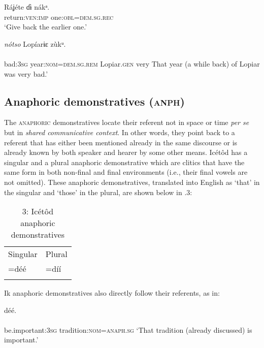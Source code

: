 \ea\label{ex:}
\gll Ráʝéte     ɗɨ nákᵃ.\\
return:\textsc{ven:imp}   one:\textsc{obl=dem.sg.rec}\\
\glt ‘Give back the earlier one.’ 
\z




\ea\label{ex:}
 \textit{nótso}       Lopíarɨɛ     zùkᵘ. \\
    \\
bad:\textsc{3sg}   year:\textsc{nom}=\textsc{dem.sg.rem}   Lopiar.\textsc{gen} very
\glt That year (a while back) of Lopiar was very bad.’
\z  





\subsection{Anaphoric demonstratives (\textsc{anph})}


The \textsc{anaphoric} demonstratives locate their referent not in space or time \textit{per se} but in \textit{shared communicative context}. In other words, they point back to a referent that has either been mentioned already in the same discourse or is already known by both speaker and hearer by some other means. Icétôd has a singular and a plural anaphoric demonstrative which are clitics that have the same form in both non-final and final environments (i.e., their final vowels are not omitted). These anaphoric demonstratives, translated into English as ‘that’ in the singular and ‘those’ in the plural, are shown below in .3:


\begin{table}
\caption{3: Icétôd anaphoric demonstratives}
\label{tab:6}


\begin{tabularx}{\textwidth}{XX}
\lsptoprule

Singular & Plural\\
=déé & =díí\\
\lspbottomrule
\end{tabularx}
\end{table}
Ik anaphoric demonstratives also directly follow their referents, as in:




\ea\label{ex:}
 déé. \\
    \\
be.important:\textsc{3sg}   tradition:\textsc{nom}=\textsc{anaph.sg}
\glt ‘That tradition (already discussed) is important.’ 
\z





